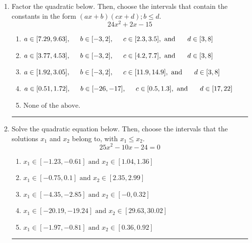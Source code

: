 \documentclass[14pt]{extbook}
\newcommand{\litem}[1]{\item#1\hspace*{-1cm}\rule{\textwidth}{0.4pt}}
\begin{document}
\begin{enumerate}
{\begin{enumerate}[label=\Alph*.]
\end{enumerate} }
\litem{
Factor the quadratic below. Then, choose the intervals that contain the constants in the form $(ax+b)(cx+d); b \leq d.$\[ 24x^{2} +2 x -15 \]\begin{enumerate}[label=\Alph*.]
\item \( a \in [7.29, 9.63], \hspace*{5mm} b \in [-3, 2], \hspace*{5mm} c \in [2.3, 3.5], \text{ and } \hspace*{5mm} d \in [3, 8] \)
\item \( a \in [3.77, 4.53], \hspace*{5mm} b \in [-3, 2], \hspace*{5mm} c \in [4.2, 7.7], \text{ and } \hspace*{5mm} d \in [3, 8] \)
\item \( a \in [1.92, 3.05], \hspace*{5mm} b \in [-3, 2], \hspace*{5mm} c \in [11.9, 14.9], \text{ and } \hspace*{5mm} d \in [3, 8] \)
\item \( a \in [0.51, 1.72], \hspace*{5mm} b \in [-26, -17], \hspace*{5mm} c \in [0.5, 1.3], \text{ and } \hspace*{5mm} d \in [17, 22] \)
\item \( \text{None of the above.} \)

\end{enumerate} }
\litem{
Solve the quadratic equation below. Then, choose the intervals that the solutions $x_1$ and $x_2$ belong to, with $x_1 \leq x_2$.\[ 25x^{2} -10 x -24 = 0 \]\begin{enumerate}[label=\Alph*.]
\item \( x_1 \in [-1.23, -0.61] \text{ and } x_2 \in [1.04, 1.36] \)
\item \( x_1 \in [-0.75, 0.1] \text{ and } x_2 \in [2.35, 2.99] \)
\item \( x_1 \in [-4.35, -2.85] \text{ and } x_2 \in [-0, 0.32] \)
\item \( x_1 \in [-20.19, -19.24] \text{ and } x_2 \in [29.63, 30.02] \)
\item \( x_1 \in [-1.97, -0.81] \text{ and } x_2 \in [0.36, 0.92] \)


\end{enumerate}}
\end{enumerate}
\end{document}
